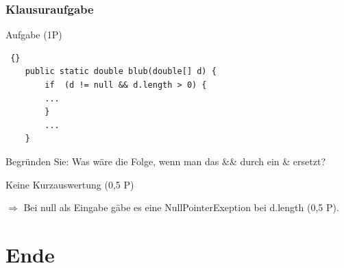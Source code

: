 \begin{frame}[fragile]
\frametitle {Klausuraufgabe} 
	\begin{block} {Aufgabe (1P)}

	\begin{lstlisting} {}
	public static double blub(double[] d) {
		if  (d != null && d.length > 0) {
		...
		}
		...
	}
	\end{lstlisting}
	Begründen Sie: Was wäre die Folge, wenn man das \&\& durch ein \& ersetzt?

	\begin{itemize}	
	 {
	\item Keine Kurzauswertung (0,5 P) 
	\item $\Rightarrow$ Bei null als Eingabe gäbe es eine NullPointerExeption bei d.length (0,5 P).
	}
	\end{itemize}
	\end{block} 
\end{frame}


\section{Ende}





